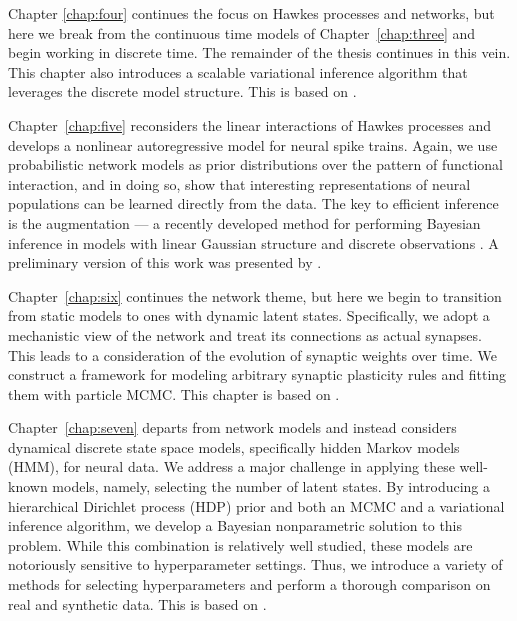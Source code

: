 Chapter \ref{chap:four} continues the focus on Hawkes processes and
networks, but here we break from the continuous time models of
Chapter~\ref{chap:three} and begin working in discrete time. The
remainder of the thesis continues in this vein.  This chapter also
introduces a scalable variational inference algorithm that leverages
the discrete model structure. This is based on
\citet{linderman2015scalable}.

Chapter~\ref{chap:five} reconsiders the linear interactions of Hawkes
processes and develops a nonlinear autoregressive model for neural
spike trains. Again, we use probabilistic network models as prior
distributions over the pattern of functional interaction, and in doing
so, show that interesting representations of neural populations can
be learned directly from the data. The key to efficient inference is
the \polyagamma augmentation --- a recently developed method for
performing Bayesian inference in models with linear Gaussian structure
and discrete observations \citep{polson2013bayesian}. 
A preliminary version of this work
was presented by \citet{linderman2015cosyne}.

Chapter~\ref{chap:six} continues the network theme, but here we begin
to transition from static models to ones with dynamic latent
states. Specifically, we adopt a mechanistic view of the network and
treat its connections as actual synapses.  This leads to a
consideration of the evolution of synaptic weights over time.
We construct a framework for modeling arbitrary synaptic plasticity rules
and fitting them with particle MCMC.  This chapter is based on
\citet{linderman2014framework}.

Chapter~\ref{chap:seven} departs from network models and instead
considers dynamical discrete state space models, specifically hidden Markov
models (HMM), for neural data. We address a major challenge in
applying these well-known models, namely, selecting the number of
latent states. By introducing a hierarchical Dirichlet process (HDP)
prior and both an MCMC and a variational inference algorithm, we
develop a Bayesian nonparametric solution to this problem.  While this
combination is relatively well studied, these models are notoriously
sensitive to hyperparameter settings. Thus, we introduce a variety of
methods for selecting hyperparameters and perform a thorough
comparison on real and synthetic data. This is based on
\citet{linderman2016nonparametric}.

